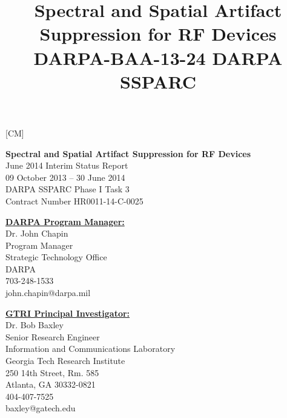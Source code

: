 \newabbrev{}[CM]

\usepackage{fancyheadings} %
\pagestyle{fancyplain} %
\title{\Large{\textbf{Spectral and Spatial Artifact Suppression for RF Devices}\\
DARPA-BAA-13-24 DARPA SSPARC}}

\vspace*{6.6923pt}   %
\noindent\textbf{Spectral and Spatial Artifact Suppression for RF Devices}\\
June 2014 Interim Status Report\\
09 October 2013 -- 30 June 2014\\
DARPA SSPARC Phase I Task 3\\
Contract Number HR0011-14-C-0025\\
\vspace{13.3846pt}

\noindent\begin{minipage}[b]{0.45\linewidth}
\textbf{\underline{DARPA Program Manager:}}\\
Dr. John Chapin\\
Program Manager\\
Strategic Technology Office\\
DARPA\\
703-248-1533\\
john.chapin@darpa.mil\\	
\vspace{13.3846pt}   %
\vspace{13.3846pt}
\end{minipage}
\hspace{0.5cm}
\noindent\begin{minipage}[b]{0.45\linewidth}
\textbf{\underline{GTRI Principal Investigator:}}\\
Dr. Bob Baxley\\
Senior Research Engineer\\
Information and Communications Laboratory\\
Georgia Tech Research Institute\\
250 14th Street, Rm. 585\\
Atlanta, GA 30332-0821\\
404-407-7525\\
baxley@gatech.edu\\
\end{minipage}


